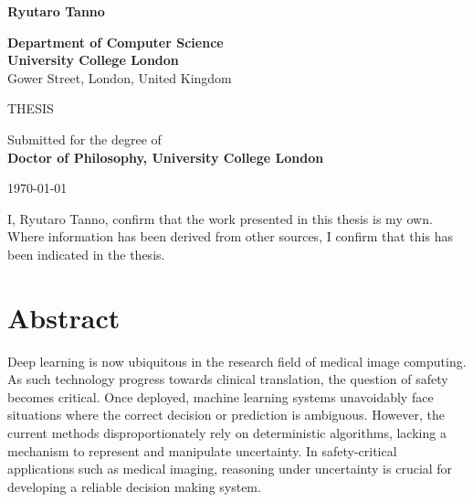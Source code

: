 \documentclass[12pt,a4paper,twoside]{book}
\begin{document}
\begin{titlepage}
\begin{center}
{\vspace{5em}
\LARGE \textbf{Ryutaro Tanno}
 \vspace{3em}%
\begin{center}%
	\large
	\textbf{Department of Computer Science} \\
	\textbf{University College London}\\
	Gower Street, London, United Kingdom\\
\end{center}%
\vspace{4em}%


\begin{center}%
	\large THESIS %
	\vspace{1em}
\end{center}%

 \begin{center}%
 	\large
	Submitted for the degree of \\
	\textbf{Doctor of Philosophy, University College London} \\
\end{center}%
\vspace{1em}%



 \vfill
% 
% 

{\Large \today}

}
\end{center}
\end{titlepage}


\clearpage


I, Ryutaro Tanno, confirm that the work presented in this thesis is my own. Where information has been derived from other sources, I confirm that this has been indicated in the thesis.

\clearpage


\chapter*{Abstract}
Deep learning is now ubiquitous in the research field of medical image computing. As such technology progress towards clinical translation, the question of safety becomes critical. Once deployed, machine learning systems unavoidably face situations where the correct decision or prediction is ambiguous. However, the current methods disproportionately rely on deterministic algorithms, lacking a mechanism to represent and manipulate uncertainty. In safety-critical applications such as medical imaging, reasoning under uncertainty is crucial for developing a reliable decision making system. 
\end{document}

